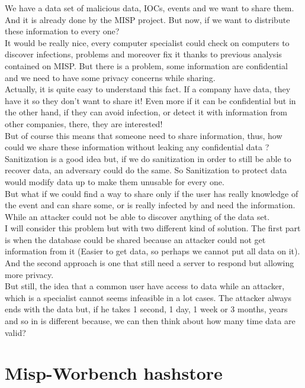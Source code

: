 \documentclass[10pt]{article}
\begin{document}
We have a data set of malicious data, IOCs, events and we want to share them. And it is already done by the MISP project. But now, if we want to distribute these information to every one?\\
It would be really nice, every computer specialist could check on computers to discover infections, problems and moreover fix it thanks to previous analysis contained on MISP. But there is a problem, some information are confidential and we need to have some privacy concerns while sharing. \\
Actually, it is quite easy to understand this fact. If a company have data, they have it so they don't want to share it! Even more if it can be confidential but in the other hand, if they can avoid infection, or detect it with information from other companies, there, they are interested! \\
But of course this means that someone need to share information, thus, how could we share these information without leaking any confidential data ?\\
Sanitization is a good idea but, if we do sanitization in order to still be able to recover data, an adversary could do the same. So Sanitization to protect data would modify data up to make them unusable for every one.\\
But what if we could find a way to share only if the user has really knowledge of the event and can share some, or is really infected by and need the information. While an attacker could not be able to discover anything of the data set.\\
I will consider this problem but with two different kind of solution. The first part is when the database could be shared because an attacker could not get information from it (Easier to get data, so perhaps we cannot put all data on it).\\
And the second approach is one that still need a server to respond but allowing more privacy.\\

But still, the idea that a common user have access to data while an attacker, which is a specialist cannot seems infeasible in a lot cases. The attacker always ends with the data but, if he takes 1 second, 1 day, 1 week or 3 months, years and so in is different because, we can then think about how many time data are valid? \\


\section{Misp-Worbench hashstore}
\end{document}
